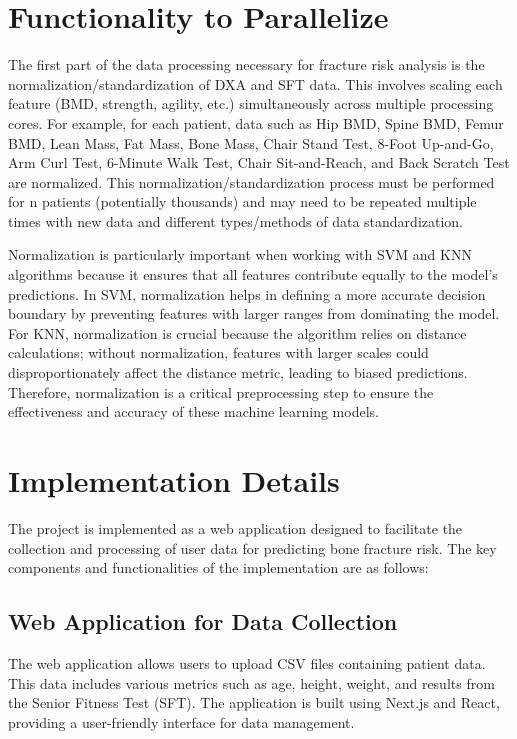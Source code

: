\documentclass[a4paper,12pt]{report}
\begin{document}
\chapter{Functionality to Parallelize}
The first part of the data processing necessary for fracture risk analysis is the normalization/standardization of DXA and SFT data. This involves scaling each feature (BMD, strength, agility, etc.) simultaneously across multiple processing cores. For example, for each patient, data such as Hip BMD, Spine BMD, Femur BMD, Lean Mass, Fat Mass, Bone Mass, Chair Stand Test, 8-Foot Up-and-Go, Arm Curl Test, 6-Minute Walk Test, Chair Sit-and-Reach, and Back Scratch Test are normalized. This normalization/standardization process must be performed for n patients (potentially thousands) and may need to be repeated multiple times with new data and different types/methods of data standardization.

Normalization is particularly important when working with SVM and KNN algorithms because it ensures that all features contribute equally to the model's predictions. In SVM, normalization helps in defining a more accurate decision boundary by preventing features with larger ranges from dominating the model. For KNN, normalization is crucial because the algorithm relies on distance calculations; without normalization, features with larger scales could disproportionately affect the distance metric, leading to biased predictions. Therefore, normalization is a critical preprocessing step to ensure the effectiveness and accuracy of these machine learning models.

\chapter{Implementation Details}
The project is implemented as a web application designed to facilitate the collection and processing of user data for predicting bone fracture risk. The key components and functionalities of the implementation are as follows:

\section{Web Application for Data Collection}
The web application allows users to upload CSV files containing patient data. This data includes various metrics such as age, height, weight, and results from the Senior Fitness Test (SFT). The application is built using Next.js and React, providing a user-friendly interface for data management.
\end{document}
